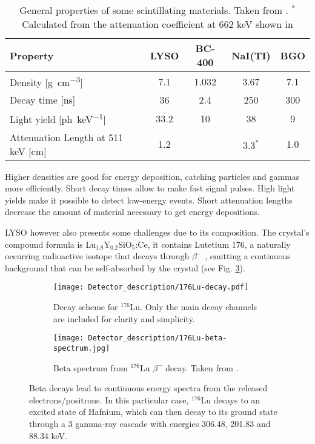 \begin{table}[H]
  \caption{General properties of some scintillating materials. Taken from \cite{mukhopadhyay2004plastic,Luxium_LYSO,Luxium_plastic,SaintGobain_NaI}. $^*$Calculated from the attenuation coefficient at 662 \unit{\kilo\eV} shown in \cite[p.~3]{SaintGobain_NaI}}
  \centering
  \begin{tabular}{ l c c c c}
    \midrule
    Property & LYSO & BC-400 & NaI(TI) & BGO\\
    \midrule
    Density [\unit{\g\per\cm\cubed}] & 7.1 & 1.032 & 3.67 & 7.1\\
    Decay time [\unit{\nano\s}]  & 36 & 2.4 & 250 & 300\\
    Light yield [\unit{ph\per\kilo\eV}] & 33.2 & 10 & 38 & 9\\
    Attenuation Length at 511 \unit{\kilo\eV} [\unit{\cm}] & 1.2 &  & $3.3^{*}$ & 1.0\\
    \bottomrule
  \end{tabular}
  \label{tab:scintillators}
\end{table}

Higher densities are good for energy deposition, catching particles and gammas more efficiently. Short decay times allow to make fast signal pulses. High light yields make it possible to detect low-energy events. Short attenuation lengths decrease the amount of material necessary to get energy depositions.

LYSO however also presents some challenges due to its composition. The crystal's compound formula is Lu$_{1.8}$Y$_{0.2}$SiO$_5$:Ce, it contains Lutetium 176, a naturally occurring radioactive isotope that decays through $\beta^-$ \cite{Luxium_LYSO}, emitting a continuous background that can be self-absorbed by the crystal (see Fig. \ref{fig:LYSO_decay}).

\begin{figure}[H]
  \centering
  \begin{subfigure}[t]{0.45\textwidth}
    \texttt{[image: Detector\_description/176Lu-decay.pdf]}
    \caption{\label{sfig:176Lu}Decay scheme for $^{176}$Lu. Only the main decay channels are included for clarity and simplicity.}
  \end{subfigure}
  \hfill
  \begin{subfigure}[t]{0.5\textwidth}
    \texttt{[image: Detector\_description/176Lu-beta-spectrum.jpg]}
    \caption{\label{sfig:176Lu_beta_spectra}Beta spectrum from $^{176}$Lu $\beta^-$ decay. Taken from \cite{IAEA}.}
  \end{subfigure}
  \caption{\label{fig:LYSO_decay}Beta decays lead to continuous energy spectra from the released electrons/positrons. In this particular case, $^{176}$Lu decays to an excited state of Hafnium, which can then decay to its ground state through a 3 gamma-ray cascade with energies 306.48, 201.83 and 88.34 keV.}
\end{figure}

